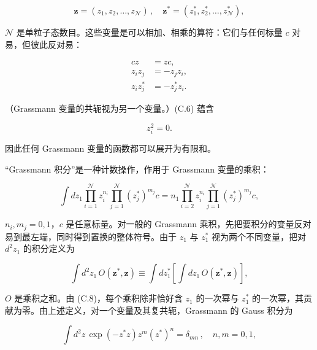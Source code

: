 \begin{equation*}
\mathbf {z} = \left( z _ {1}, z _ {2}, \dots , z _ {\mathcal {N}} \right) \, , \quad \mathbf {z} ^ {*} = \left( z _ {1} ^ {*}, z _ {2} ^ {*}, \dots , z _ {\mathcal {N}} ^ {*} \right) ,
\tag{C.5}
\end{equation*}

$\mathcal{N}$ 是单粒子态数目。这些变量是可以相加、相乘的算符：它们与任何标量 $c$ 对易，但彼此反对易：

\begin{align*}
cz & = zc ,\\
z _ {i} z _ {j} & = - z _ {j} z _ {i} ,\\
z _ {i} z _ {j} ^ {*} & = - z _ {j} ^ {*} z _ {i} .
\tag{C.6}
\end{align*}

（Grassmann 变量的共轭视为另一个变量。）(C.6) 蕴含

\begin{equation*}
z _ {i} ^ {2} = 0.
\tag{C.7}
\end{equation*}

因此任何 Grassmann 变量的函数都可以展开为有限和。

“Grassmann 积分”是一种计数操作，作用于 Grassmann 变量的乘积：

\begin{equation*}
\int d z _ {1} \prod_{i = 1} ^ {\mathcal {N}} z _ {i} ^ {n _ {i}} \prod_{j = 1} ^ {\mathcal {N}} \left( z _ {j} ^ {*} \right) ^ {m _ {j}} c = n _ {1} \prod_{i = 2} ^ {\mathcal {N}} z _ {i} ^ {n _ {i}} \prod_{j = 1} ^ {\mathcal {N}} \left( z _ {j} ^ {*} \right) ^ {m _ {j}} c ,
\tag{C.8}
\end{equation*}

$n_{i}, m_{j} = 0, 1$，$c$ 是任意标量。对一般的 Grassmann 乘积，先把要积分的变量反对易到最左端，同时得到置换的整体符号。由于 $z_{1}$ 与 $z_{1}^{*}$ 视为两个不同变量，把对 $d^{2}z_{1}$ 的积分定义为

\begin{equation*}
\int d ^ {2} z _ {1} \, O ( \mathbf {z} ^ {*}, \mathbf {z} ) \equiv \int d z _ {1} ^ {*} \left[ \int d z _ {1} \, O ( \mathbf {z} ^ {*}, \mathbf {z} ) \right] ,
\tag{C.9}
\end{equation*}

$O$ 是乘积之和。由 (C.8)，每个乘积除非恰好含 $z_{1}$ 的一次幂与 $z_{1}^{*}$ 的一次幂，其贡献为零。由上述定义，对一个变量及其复共轭，Grassmann 的 Gauss 积分为

\begin{equation*}
\int d ^ {2} z \, \exp \left( - z ^ {*} z \right) z ^ {m} \left( z ^ {*} \right) ^ {n} = \delta_{mn} \, , \quad n, m = 0, 1 ,
\tag{C.10}
\end{equation*}

